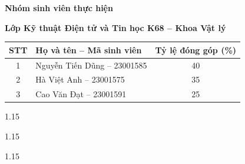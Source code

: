 \documentclass[
12pt,
oneside,
english,
doublespacing,
nolistspacing,
liststotoc,
parskip,
headsepline,
chapterinoneline,
]{HUSdissertation}
\begin{document}
\clearpage


\textbf{Nhóm sinh viên thực hiện}

\vspace{0.3cm}

\textbf{Lớp Kỹ thuật Điện tử và Tin học K68 -- Khoa Vật lý}

\vspace{0.5cm}

\begin{center}
\begin{tabular}{c l c}
\hline
\textbf{STT} & \textbf{Họ và tên -- Mã sinh viên} & \textbf{Tỷ lệ đóng góp (\%)} \\
\hline
1 & Nguyễn Tiến Dũng -- 23001585 & 40\\
2 & Hà Việt Anh -- 23001575 & 35\\
3 & Cao Văn Đạt -- 23001591 & 25\\
\hline
\end{tabular}
\end{center}

\clearpage
%

\begin{spacing}{1.15}
	\tableofcontents 	%
\end{spacing}

\begin{spacing}{1.15}
	\listoffigures 		%
\end{spacing}

\begin{spacing}{1.15}
	\listoftables		%
\end{spacing}


\end{document}
